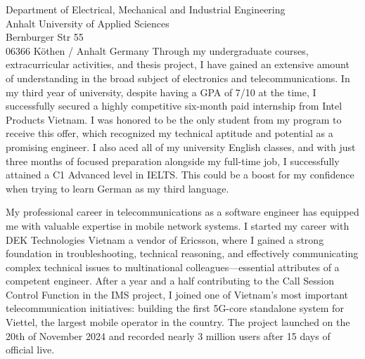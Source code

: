 \documentclass[a4paper,12pt]{letter}
\begin{document}
\begin{letter}{
    Department of Electrical, Mechanical and Industrial Engineering
    \\ Anhalt University of Applied Sciences
    \\ Bernburger Str 55 
    \\ 06366 Köthen / Anhalt Germany
}
Through my undergraduate courses, extracurricular activities, and thesis project, I have gained an extensive amount of understanding in the broad subject of electronics and telecommunications. In my third year of university, despite having a GPA of 7/10 at the time, I successfully secured a highly competitive six-month paid internship from Intel Products Vietnam. I was honored to be the only student from my program to receive this offer, which recognized my technical aptitude and potential as a promising engineer. I also aced all of my university English classes, and with just three months of focused preparation alongside my full-time job, I successfully attained a C1 Advanced level in IELTS. This could be a boost for my confidence when trying to learn German as my third language.

My professional career in telecommunications as a software engineer has equipped me with valuable expertise in mobile network systems. I started my career with DEK Technologies Vietnam a vendor of Ericsson, where I gained a strong foundation in troubleshooting, technical reasoning, and effectively communicating complex technical issues to multinational colleagues—essential attributes of a competent engineer. After a year and a half contributing to the Call Session Control Function in the IMS project, I joined one of Vietnam's most important telecommunication initiatives: building the first 5G-core standalone system for Viettel, the largest mobile operator in the country. The project launched on the 20th of November 2024 and recorded nearly 3 million users after 15 days of official live.




\end{letter}
\end{document}
